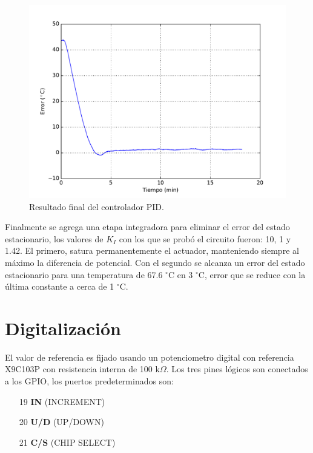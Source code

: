 \documentclass{wileysix}
\begin{document}
\begin{figure}[h]
	\centering
	\includegraphics[width=0.6\linewidth]{extras/final_PID.pdf}
	\caption{Resultado final del controlador PID.}
\end{figure}
Finalmente se agrega una etapa integradora para eliminar el error del estado estacionario, los valores de $K_I$ con los que se prob\'o el circuito fueron: 10, 1 y 1.42. El primero, satura permanentemente el actuador, manteniendo siempre al m\'aximo la diferencia de potencial. Con el segundo se alcanza un error del estado estacionario para una temperatura de 67.6 $^\circ$C en 3 $^\circ$C, error que se reduce con la \'ultima constante a cerca de 1 $^\circ$C.

\section{Digitalizaci\'on}
El valor de referencia es fijado usando un potenciometro digital con referencia X9C103P \cite{digi-pot} con resistencia interna de 100 k$\Omega$. Los tres pines l\'ogicos son conectados a los GPIO, los puertos predeterminados son:
\begin{enumerate}
	\item[19] \textbf{IN} (INCREMENT) 
	\item[20] \textbf{U/D} (UP/DOWN)
	\item[21] \textbf{C/S} (CHIP SELECT)
\end{enumerate}
\end{document}
